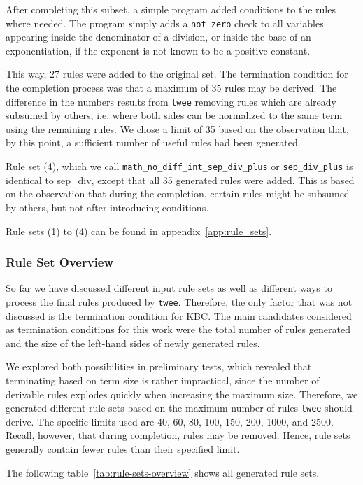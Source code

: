 After completing this subset, a simple program added conditions to the rules where needed. The program simply adds a \texttt{not\_zero} check to all variables appearing inside the denominator of a division, or inside the base of an exponentiation, if the exponent is not known to be a positive constant.

This way, 27 rules were added to the original set. The termination condition for the completion process was that a maximum of 35 rules may be derived. The difference in the numbers results from \texttt{twee} removing rules which are already subsumed by others, i.e. where both sides can be normalized to the same term using the remaining rules. We chose a limit of 35 based on the observation that, by this point, a sufficient number of useful rules had been generated.

Rule set (4), which we call \texttt{math\_no\_diff\_int\_sep\_div\_plus} or \texttt{sep\_div\_plus} is identical to sep\_div, except that all 35 generated rules were added. This is based on the observation that during the completion, certain rules might be subsumed by others, but not after introducing conditions. 

Rule sets (1) to (4) can be found in appendix~\ref{app:rule_sets}.

\subsubsection{Rule Set Overview}
So far we have discussed different input rule sets as well as different ways to process the final rules produced by \texttt{twee}. Therefore, the only factor that was not discussed is the termination condition for KBC. The main candidates considered as termination conditions for this work were the total number of rules generated and the size of the left-hand sides of newly generated rules. 

We explored both possibilities in preliminary tests, which revealed that terminating based on term size is rather impractical, since the number of derivable rules explodes quickly when increasing the maximum size. Therefore, we generated different rule sets based on the maximum number of rules \texttt{twee} should derive. The specific limits used are 40, 60, 80, 100, 150, 200, 1000, and 2500. Recall, however, that during completion, rules may be removed. Hence, rule sets generally contain fewer rules than their specified limit.

The following table~\ref{tab:rule-sets-overview} shows all generated rule sets.


